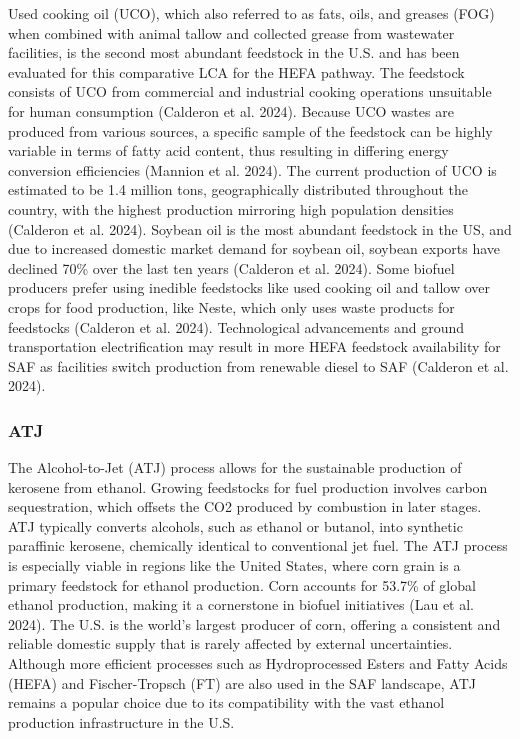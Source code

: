 \documentclass[12pt]{article}
\begin{document}
\begin{Appendix}
Used cooking oil (UCO), which also referred to as fats, oils, and greases (FOG) when combined with animal tallow and collected grease from wastewater facilities, is the second most abundant feedstock in the U.S. and has been evaluated for this comparative LCA for the HEFA pathway. The feedstock consists of UCO from commercial and industrial cooking operations unsuitable for human consumption (Calderon et al. 2024). Because UCO wastes are produced from various sources, a specific sample of the feedstock can be highly variable in terms of fatty acid content, thus resulting in differing energy conversion efficiencies (Mannion et al. 2024). The current production of UCO is estimated to be 1.4 million tons, geographically distributed throughout the country, with the highest production mirroring high population densities (Calderon et al. 2024).  Soybean oil is the most abundant feedstock in the US, and due to increased domestic market demand for soybean oil, soybean exports have declined 70\% over the last ten years (Calderon et al. 2024). Some biofuel producers prefer using inedible feedstocks like used cooking oil and tallow over crops for food production, like Neste, which only uses waste products for feedstocks (Calderon et al. 2024). Technological advancements and ground transportation electrification may result in more HEFA feedstock availability for SAF as facilities switch production from renewable diesel to SAF (Calderon et al. 2024). 


\subsubsection{ATJ}

 The Alcohol-to-Jet (ATJ) process allows for the sustainable production of kerosene from ethanol. Growing feedstocks for fuel production involves carbon sequestration, which offsets the CO2 produced by combustion in later stages. ATJ typically converts alcohols, such as ethanol or butanol, into synthetic paraffinic kerosene, chemically identical to conventional jet fuel. The ATJ process is especially viable in regions like the United States, where corn grain is a primary feedstock for ethanol production. Corn accounts for 53.7\% of global ethanol production, making it a cornerstone in biofuel initiatives (Lau et al. 2024). The U.S. is the world’s largest producer of corn, offering a consistent and reliable domestic supply that is rarely affected by external uncertainties. Although more efficient processes such as Hydroprocessed Esters and Fatty Acids (HEFA) and Fischer-Tropsch (FT) are also used in the SAF landscape, ATJ remains a popular choice due to its compatibility with the vast ethanol production infrastructure in the U.S. 
 

\end{Appendix}
\end{document}
